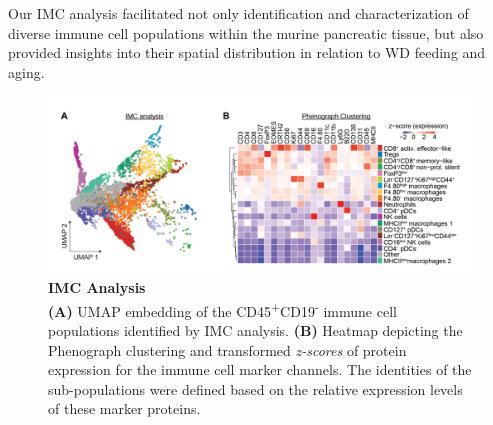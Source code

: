 Our IMC analysis facilitated not only identification and characterization of diverse immune cell populations within the murine pancreatic tissue, but also provided insights into their spatial distribution in relation to WD feeding and aging. 



\begin{figure}[htbp]
\centering
\includegraphics[width=\linewidth]{Chapter4/Fig/F2-2-01.png}
\caption[res-imc]{\textbf{IMC Analysis}\\
\textbf{(A)} UMAP embedding of the CD45\textsuperscript{+}CD19\textsuperscript{-} immune cell populations identified by IMC analysis. \textbf{(B)}  Heatmap depicting the Phenograph clustering and transformed \textit{z-scores} of protein expression for the immune cell marker channels. The identities of the sub-populations were defined based on the relative expression levels of these marker proteins.}
\label{fig2-2}
\end{figure}

